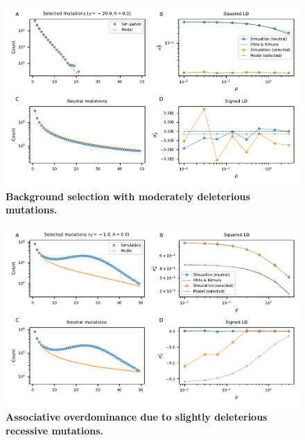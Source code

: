 \documentclass[]{article}
\begin{document}
\begin{figure}[ht!]
    \centering
    \includegraphics{../figures/bgs_gamma_-20.0_h_0.5_n_50}
    \caption{
        \textbf{Background selection with moderately deleterious mutations.}
    }
    \label{fig:bgs2}
\end{figure}

\begin{figure}[ht!]
    \centering
    \includegraphics{../figures/bgs_gamma_-1.0_h_0.0_n_50}
    \caption{
        \textbf{Associative overdominance due to slightly deleterious recessive mutations.}
    }
    \label{fig:bgs3}
\end{figure}
\end{document}
